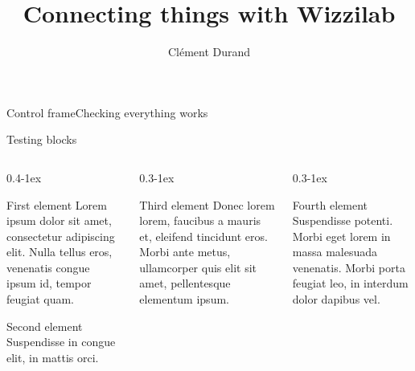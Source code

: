 \documentclass[aspectratio=169]{beamer}
\title[Stage de seconde année à l'École polytechnique]
      {Connecting things with Wizzilab}
      [Wizzilab]
\author{Clément Durand}
\begin{document}
\maketitle



\begin{frame}{Control frame}{Checking everything works}
  \lipsum[1]
\end{frame}

\begin{frame}{Testing blocks}
  \begin{columns}[t,onlytextwidth]
    \begin{column}{0.4\textwidth-1ex}
      \begin{block}{First element}
        Lorem ipsum dolor sit amet, consectetur adipiscing elit. Nulla tellus eros, venenatis congue ipsum id, tempor feugiat quam.
      \end{block}
      \begin{block}{Second element}
        Suspendisse in congue elit, in mattis orci.
      \end{block}
    \end{column}

    \begin{column}{0.3\textwidth-1ex}
      \begin{block}{Third element}
        Donec lorem lorem, faucibus a mauris et, eleifend tincidunt eros. Morbi ante metus, ullamcorper quis elit sit amet, pellentesque elementum ipsum.
      \end{block}
    \end{column}

    \begin{column}{0.3\textwidth-1ex}
      \begin{block}{Fourth element}
        Suspendisse potenti. Morbi eget lorem in massa malesuada venenatis. Morbi porta feugiat leo, in interdum dolor dapibus vel.
      \end{block}
    \end{column}
  \end{columns}
\end{frame}
\end{document}
